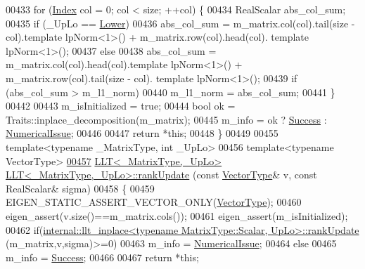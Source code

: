 \begin{DoxyCode}
00433   \textcolor{keywordflow}{for} (\hyperlink{group___cholesky___module_ac7a64274814fa76e8b1e9e945546037f}{Index} col = 0; col < size; ++col) \{
00434     RealScalar abs\_col\_sum;
00435     \textcolor{keywordflow}{if} (\_UpLo == \hyperlink{group__enums_gga39e3366ff5554d731e7dc8bb642f83cda891792b8ed394f7607ab16dd716f60e6}{Lower})
00436       abs\_col\_sum = m\_matrix.col(col).tail(size - col).template lpNorm<1>() + m\_matrix.row(col).head(col).
      template lpNorm<1>();
00437     \textcolor{keywordflow}{else}
00438       abs\_col\_sum = m\_matrix.col(col).head(col).template lpNorm<1>() + m\_matrix.row(col).tail(size - col).
      template lpNorm<1>();
00439     \textcolor{keywordflow}{if} (abs\_col\_sum > m\_l1\_norm)
00440       m\_l1\_norm = abs\_col\_sum;
00441   \}
00442 
00443   m\_isInitialized = \textcolor{keyword}{true};
00444   \textcolor{keywordtype}{bool} ok = Traits::inplace\_decomposition(m\_matrix);
00445   m\_info = ok ? \hyperlink{group__enums_gga85fad7b87587764e5cf6b513a9e0ee5ea52581b035f4b59c203b8ff999ef5fcea}{Success} : \hyperlink{group__enums_gga85fad7b87587764e5cf6b513a9e0ee5eaaf9b736d310a664e7729d163a035cc5f}{NumericalIssue};
00446 
00447   \textcolor{keywordflow}{return} *\textcolor{keyword}{this};
00448 \}
00449 
00455 \textcolor{keyword}{template}<\textcolor{keyword}{typename} \_MatrixType, \textcolor{keywordtype}{int} \_UpLo>
00456 \textcolor{keyword}{template}<\textcolor{keyword}{typename} VectorType>
\hyperlink{group___cholesky___module_ac70d4de31a3626c76c6ea3833af5fa6f}{00457} \hyperlink{group___cholesky___module_class_eigen_1_1_l_l_t}{LLT<\_MatrixType,\_UpLo>} \hyperlink{group___cholesky___module_class_eigen_1_1_l_l_t}{LLT<\_MatrixType,\_UpLo>::rankUpdate}
      (\textcolor{keyword}{const} \hyperlink{struct_vector_type}{VectorType}& v, \textcolor{keyword}{const} RealScalar& sigma)
00458 \{
00459   EIGEN\_STATIC\_ASSERT\_VECTOR\_ONLY(\hyperlink{struct_vector_type}{VectorType});
00460   eigen\_assert(v.size()==m\_matrix.cols());
00461   eigen\_assert(m\_isInitialized);
00462   \textcolor{keywordflow}{if}(\hyperlink{struct_eigen_1_1internal_1_1llt__inplace}{internal::llt\_inplace<typename MatrixType::Scalar, UpLo>::rankUpdate}
      (m\_matrix,v,sigma)>=0)
00463     m\_info = \hyperlink{group__enums_gga85fad7b87587764e5cf6b513a9e0ee5eaaf9b736d310a664e7729d163a035cc5f}{NumericalIssue};
00464   \textcolor{keywordflow}{else}
00465     m\_info = \hyperlink{group__enums_gga85fad7b87587764e5cf6b513a9e0ee5ea52581b035f4b59c203b8ff999ef5fcea}{Success};
00466 
00467   \textcolor{keywordflow}{return} *\textcolor{keyword}{this};

\end{DoxyCode}
